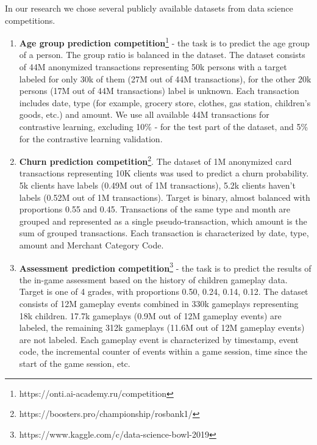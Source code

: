\documentclass{article}
\begin{document}
In our research we chose several publicly available datasets from data science competitions.
\begin{enumerate}
    \item \textbf{Age group prediction competition}\footnote{https://onti.ai-academy.ru/competition} - the task is to predict the age group of a person. The group ratio is balanced in the dataset. The dataset consists of 44M anonymized transactions representing 50k persons with a target labeled for only 30k of them (27M out of 44M transactions), for the other 20k persons (17M out of 44M transactions) label is unknown. Each transaction includes date, type (for example, grocery store, clothes, gas station, children's goods, etc.) and amount. We use all available 44M transactions for contrastive learning, excluding 10\% - for the test part of the dataset, and  5\% for the contrastive learning validation.
        
    
    \item \textbf{Churn prediction competition}\footnote{https://boosters.pro/championship/rosbank1/}. The dataset of 1M anonymized card transactions representing 10K clients was used to predict a churn probability. 5k clients have labels (0.49M out of 1M transactions), 5.2k clients haven't labels (0.52M out of 1M transactions). Target is binary, almost balanced with proportions 0.55 and 0.45. Transactions of the same type and month are grouped and represented as a single pseudo-transaction, which amount is the sum of grouped transactions. Each transaction is characterized by date, type, amount and Merchant Category Code.
    
    \item \textbf{Assessment prediction competition}\footnote{https://www.kaggle.com/c/data-science-bowl-2019} - the task is to predict the results of the in-game assessment based on the history of children gameplay data. Target is one of 4 grades, with proportions 0.50, 0.24, 0.14, 0.12. The dataset consists of 12M gameplay events combined in 330k gameplays representing 18k children. 17.7k gameplays (0.9M out of 12M gameplay events) are labeled, the remaining 312k gameplays (11.6M out of 12M gameplay events) are not labeled. Each gameplay event is characterized by timestamp, event code, the incremental counter of events within a game session, time since the start of the game session, etc.
    

\end{enumerate}
\end{document}
